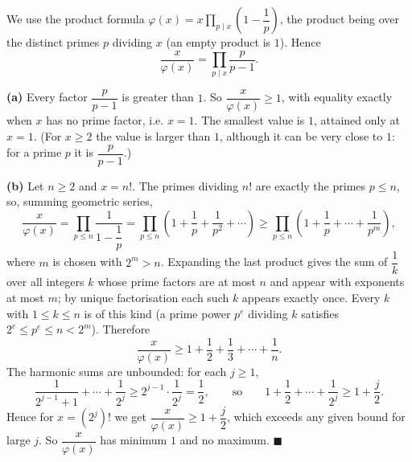 We use the product formula $\varphi(x)=x\prod_{p\mid x}\left(1-\dfrac1p\right)$, the product being over the distinct primes $p$ dividing $x$ (an empty product is $1$). Hence
\[\dfrac{x}{\varphi(x)}=\prod_{p\mid x}\dfrac{p}{p-1}.\]

\textbf{(a)} Every factor $\dfrac{p}{p-1}$ is greater than $1$. So $\dfrac{x}{\varphi(x)}\ge1$, with equality exactly when $x$ has no prime factor, i.e. $x=1$. The smallest value is $\boxed{1}$, attained only at $x=1$. (For $x\ge2$ the value is larger than $1$, although it can be very close to $1$: for a prime $p$ it is $\dfrac{p}{p-1}$.)

\textbf{(b)} Let $n\ge2$ and $x=n!$. The primes dividing $n!$ are exactly the primes $p\le n$, so, summing geometric series,
\[\dfrac{x}{\varphi(x)}=\prod_{p\le n}\dfrac{1}{1-\dfrac1p}=\prod_{p\le n}\left(1+\dfrac1p+\dfrac1{p^2}+\cdots\right)\ge\prod_{p\le n}\left(1+\dfrac1p+\cdots+\dfrac1{p^m}\right),\]
where $m$ is chosen with $2^m>n$. Expanding the last product gives the sum of $\dfrac1k$ over all integers $k$ whose prime factors are at most $n$ and appear with exponents at most $m$; by unique factorisation each such $k$ appears exactly once. Every $k$ with $1\le k\le n$ is of this kind (a prime power $p^e$ dividing $k$ satisfies $2^e\le p^e\le n<2^m$). Therefore
\[\dfrac{x}{\varphi(x)}\ge1+\dfrac12+\dfrac13+\cdots+\dfrac1n.\]
The harmonic sums are unbounded: for each $j\ge1$,
\[\dfrac{1}{2^{j-1}+1}+\cdots+\dfrac{1}{2^j}\ge2^{j-1}\cdot\dfrac{1}{2^j}=\dfrac12,\qquad\text{so}\qquad1+\dfrac12+\cdots+\dfrac{1}{2^j}\ge1+\dfrac j2.\]
Hence for $x=\left(2^j\right)!$ we get $\dfrac{x}{\varphi(x)}\ge1+\dfrac j2$, which exceeds any given bound for large $j$. So $\dfrac{x}{\varphi(x)}$ has minimum $1$ and no maximum. $\blacksquare$
